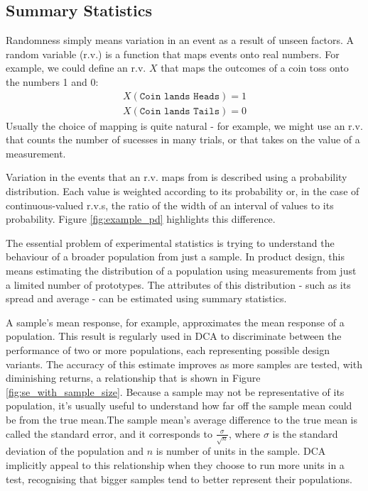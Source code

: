 \documentclass[11pt,a4paper,article]{memoir} %
\begin{document}
\subsection*{Summary Statistics}
 Randomness simply means variation in an event as a result of unseen factors. A random variable (r.v.) is a function that maps events onto real numbers. For example, we could define an r.v. $X$ that maps the outcomes of a coin toss onto the numbers 1 and 0:
 \begin{align}
	X(\texttt{Coin lands Heads}) = 1 \\
	X(\texttt{Coin lands Tails}) =0
 \end{align}
Usually the choice of mapping is quite natural - for example, we might use an r.v. that counts the number of sucesses in many trials, or that takes on the value of a measurement. 
\par
Variation in the events that an r.v. maps from is described using a probability distribution. Each value is weighted according to its probability or, in the case of continuous-valued r.v.s, the ratio of the width of an interval of values to its probability. Figure \ref{fig:example_pd} highlights this difference.
\par
The essential problem of experimental statistics is trying to understand the behaviour of a broader population from just a sample. In product design, this means estimating the distribution of a population using measurements from just a limited number of prototypes. The attributes of this distribution - such as its spread and average - can be estimated using summary statistics.
 \par
A sample's mean response, for example, approximates the mean response of a population. This result is regularly used in DCA to discriminate between the performance of two or more populations, each representing possible design variants. The accuracy of this estimate improves as more samples are tested, with diminishing returns, a relationship that is shown in Figure \ref{fig:se_with_sample_size}. Because a sample may not be representative of its population, it's usually useful to understand how far off the sample mean could be from the true mean.The sample mean's average difference to the true mean is called the standard error, and it corresponds to $\frac{\sigma}{\sqrt{n}}$, where $\sigma$ is the standard deviation of the population and $n$ is number of units in the sample. DCA implicitly appeal to this relationship when they choose to run more units in a test, recognising that bigger samples tend to better represent their populations.
\end{document}
